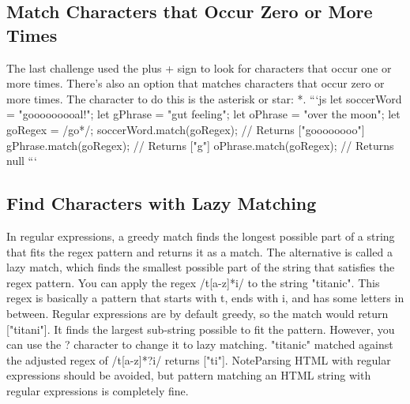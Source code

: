 \documentclass{article}%
\begin{document}
\subsection{Match Characters that Occur Zero or More Times}%
\label{subsec:MatchCharactersthatOccurZeroorMoreTimes}%
The last challenge used the plus + sign to look for characters that occur one or more times. There's also an option that matches characters that occur zero or more times.\newline%
The character to do this is the asterisk or star: *.\newline%
```js\newline%
let soccerWord = "gooooooooal!";\newline%
let gPhrase = "gut feeling";\newline%
let oPhrase = "over the moon";\newline%
let goRegex = /go*/;\newline%
soccerWord.match(goRegex); // Returns {[}"goooooooo"{]}\newline%
gPhrase.match(goRegex); // Returns {[}"g"{]}\newline%
oPhrase.match(goRegex); // Returns null\newline%
```\newline%

%
\subsection{Find Characters with Lazy Matching}%
\label{subsec:FindCharacterswithLazyMatching}%
In regular expressions, a greedy match finds the longest possible part of a string that fits the regex pattern and returns it as a match. The alternative is called a lazy match, which finds the smallest possible part of the string that satisfies the regex pattern.\newline%
You can apply the regex /t{[}a{-}z{]}*i/ to the string "titanic". This regex is basically a pattern that starts with t, ends with i, and has some letters in between.\newline%
Regular expressions are by default greedy, so the match would return {[}"titani"{]}. It finds the largest sub{-}string possible to fit the pattern.\newline%
However, you can use the ? character to change it to lazy matching. "titanic" matched against the adjusted regex of /t{[}a{-}z{]}*?i/ returns {[}"ti"{]}.\newline%
NoteParsing HTML with regular expressions should be avoided, but pattern matching an HTML string with regular expressions is completely fine.\newline%
\end{document}

